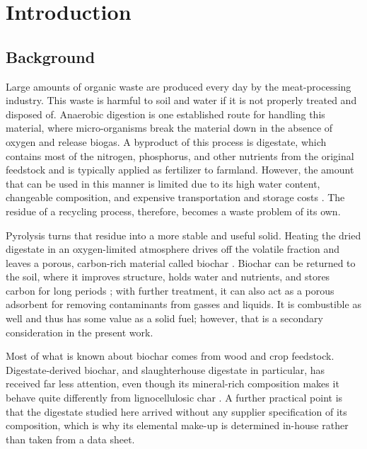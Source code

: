 \section{Introduction}

\subsection{Background}
Large amounts of organic waste are produced every day by the meat-processing industry. This waste is harmful to soil and water if it is not properly treated and disposed of. Anaerobic digestion is one established route for handling this material, where micro-organisms break the material down in the absence of oxygen and release biogas. A byproduct of this process is digestate, which contains most of the nitrogen, phosphorus, and other nutrients from the original feedstock and is typically applied as fertilizer to farmland. However, the amount that can be used in this manner is limited due to its high water content, changeable composition, and expensive transportation and storage costs \parencite{tambone-2010}. The residue of a recycling process, therefore, becomes a waste problem of its own.

\vspace{0.3em}

Pyrolysis turns that residue into a more stable and useful solid. Heating the dried digestate in an oxygen-limited atmosphere drives off the volatile fraction and leaves a porous, carbon-rich material called biochar \parencite{Qi2024}. Biochar can be returned to the soil, where it improves structure, holds water and nutrients, and stores carbon for long periods \parencite{Lehmann2015}; with further treatment, it can also act as a porous adsorbent for removing contaminants from gasses and liquids. It is combustible as well and thus has some value as a solid fuel; however, that is a secondary consideration in the present work.

\vspace{0.3em}

Most of what is known about biochar comes from wood and crop feedstock. Digestate-derived biochar, and slaughterhouse digestate in particular, has received far less attention, even though its mineral-rich composition makes it behave quite differently from lignocellulosic char \parencite{opatokun-2015}. A further practical point is that the digestate studied here arrived without any supplier specification of its composition, which is why its elemental make-up is determined in-house rather than taken from a data sheet.

